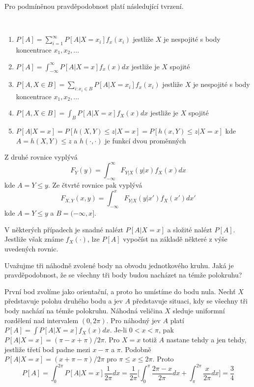 Pro podmíněnou pravděpodobnost platí následující tvrzení.
\begin{corollary}
~
\begin{enumerate}
\item $P[A] = \sum_{i = 1}^{\infty}P[A|X = x_i]f_x(x_i)$ jestliže $X$ je nespojité s body koncentrace $x_1, x_2, ...$
\item $P[A] = \int_{-\infty}^{\infty}P[A|X = x]f_x(x)dx$ jestliže je $X$ spojité
\item $P[A, X \in B] = \sum_{i: x_i \in B} P[A|X = x_i]f_x(x_i)$ jestliže $X$ je nespojité s body koncentrace $x_1, x_2, ...$
\item $P[A, X \in B] = \int_B P[A|X = x]f_X(x)dx$ jestliže je $X$ spojité
\item $P[A | X = x] = P[h(X,Y) \le z | X = x] = P[h(x,Y) \le z | X = x]$ kde $A = {h(X,Y) \le z}$ a $h(\cdot, \cdot)$ je funkcí dvou proměnných
\end{enumerate}
\end{corollary}

Z druhé rovnice vyplývá
\begin{equation*}
F_Y(y) = \int_{-\infty}^{\infty} F_{Y|X}(y|x)f_X(x)dx
\end{equation*}
kde $A = {Y \le y}$. Ze čtvrté rovnice pak vyplývá
\begin{equation*}
F_{X,Y}(x,y) = \int_{-\infty}^x F_{Y|X}(y|x')f_X(x')dx'
\end{equation*}
kde $A = {Y \le y}$ a $B = (-\infty, x]$.

V některých případech je snadné nalézt $P[A|X = x]$ a složité nalézt $P[A]$. Jestliže však známe $f_X(\cdot)$, lze $P[A]$ vypočíst na základě některé z výše uvedených rovnic. 

\begin{example}
Uvažujme tři náhodně zvolené body na obvodu jednotkového kruhu. Jaká je pravděpodobnost, že se všechny tři body budou nacházet na témže polokruhu?

První bod zvolíme jako orientační, a proto ho umístíme do bodu nula. Nechť $X$ představuje polohu druhého bodu a jev $A$ představuje situaci, kdy se všechny tři body nachází na témže polokruhu. Náhodná veličina $X$ sleduje uniformní rozdělení nad intervalem $(0, 2 \pi)$. Pro náhodný jev $A$ platí $P[A] = \int P[A|X = x]f_X(x)dx$. Je-li $0 < x < \pi$, pak $P[A|X = x] = (\pi - x + \pi)/2\pi$. Pro $X = x$ totiž $A$ nastane tehdy a jen tehdy, jestliže třetí bod padne mezi $x - \pi$ a $\pi$. Podobně $P[A|X = x] = (x + \pi - \pi)/2 \pi$ pro $\pi \le x \le 2\pi$. Proto
\begin{equation*}
P[A] = \int_0^{2\pi}P[A|X = x]\frac{1}{2\pi}dx = \frac{1}{2 \pi}\Big[\int_0^{\pi} \frac{2\pi - x}{2\pi}dx + \int_{\pi}^{2\pi}\frac{x}{2\pi}dx \Big] = \frac{3}{4}
\end{equation*}
\end{example}

